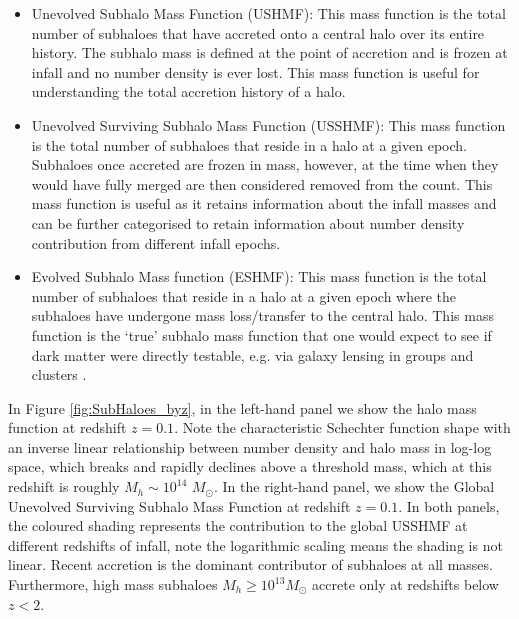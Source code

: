 \begin{itemize}
    \item Unevolved Subhalo Mass Function (USHMF): This mass function is the total number of subhaloes that have accreted onto a central halo over its entire history. The subhalo mass is defined at the point of accretion and is frozen at infall and no number density is ever lost. This mass function is useful for understanding the total accretion history of a halo.
    \item Unevolved Surviving Subhalo Mass Function (USSHMF): This mass function is the total number of subhaloes that reside in a halo at a given epoch. Subhaloes once accreted are frozen in mass, however, at the time when they would have fully merged are then considered removed from the count. This mass function is useful as it retains information about the infall masses and can be further categorised to retain information about number density contribution from different infall epochs.
    \item Evolved Subhalo Mass function (ESHMF): This mass function is the total number of subhaloes that reside in a halo at a given epoch where the subhaloes have undergone mass loss/transfer to the central halo. This mass function is the `true' subhalo mass function that one would expect to see if dark matter were directly testable, e.g. via galaxy lensing in groups and clusters \cite{Bartelmann2001WeakLensing}.
\end{itemize}

In Figure \ref{fig:SubHaloes_byz}, in the left-hand panel we show the halo mass function at redshift $z=0.1$. Note the characteristic Schechter function shape with an inverse linear relationship between number density and halo mass in log-log space, which breaks and rapidly declines above a threshold mass, which at this redshift is roughly $M_h\sim 10^{14}$ $M_{\odot}$. In the right-hand panel, we show the Global Unevolved Surviving Subhalo Mass Function at redshift $z=0.1$. In both panels, the coloured shading represents the contribution to the global USSHMF at different redshifts of infall, note the logarithmic scaling means the shading is not linear. Recent accretion is the dominant contributor of subhaloes at all masses. Furthermore, high mass subhaloes $M_h \geq 10^{13} M_{\odot}$ accrete only at redshifts below $z < 2$.

